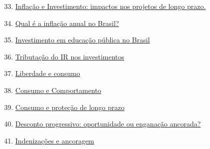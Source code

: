 \begin{apresentacao}
\begin{multicols}{2}
\begin{enumerate}[label=Atividade \arabic* --, wide]\setcounter{enumi}{32}
\item \hyperref[fin-ativ-33]{Inflação e Investimento: impactos nos projetos de longo prazo.}
\item \hyperref[fin-ativ-34]{Qual é a inflação anual no Brasil?}
\end{enumerate}
\vspace{1em}

\begin{enumerate}[label=Atividade \arabic* --, wide]\setcounter{enumi}{34}
\item \hyperref[fin-ativ-35]{Investimento em educação pública no Brasil}
\end{enumerate}

\begin{enumerate}[label=Atividade \arabic* --, wide]\setcounter{enumi}{35}
\item \hyperref[fin-ativ-36]{Tributação do IR nos investimentos}
\end{enumerate}
\vspace{1em}

\begin{enumerate}[label=Atividade \arabic* --, wide]\setcounter{enumi}{36}
\item \hyperref[fin-ativ-37]{Liberdade e consumo}
\item \hyperref[fin-ativ-38]{Consumo e Comportamento}
\item \hyperref[fin-ativ-39]{Consumo e proteção de longo prazo}
\end{enumerate}

\begin{enumerate}[label=Atividade \arabic* --, wide]\setcounter{enumi}{39}
\item \hyperref[fin-ativ-40]{Desconto progressivo: oportunidade ou enganação ancorada?}
\item \hyperref[fin-ativ-41]{Indenizações e ancoragem}
\end{enumerate}


\end{multicols}
\end{apresentacao}

